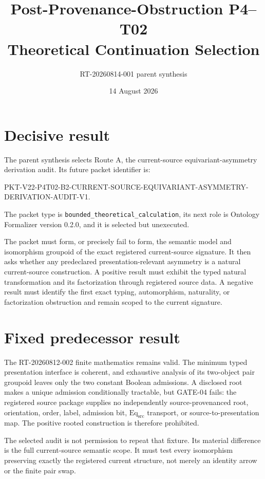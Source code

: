 \documentclass[11pt]{article}
\title{Post-Provenance-Obstruction P4--T02\\Theoretical Continuation Selection}
\author{RT-20260814-001 parent synthesis}
\date{14 August 2026}
\newcommand{\EqSrc}{\ensuremath{\mathrm{Eq}_{\mathrm{src}}}}
\begin{document}
\maketitle

\section{Decisive result}

The parent synthesis selects Route A, the current-source equivariant-asymmetry
derivation audit.  Its future packet identifier is:
{\small\ttfamily\raggedright
PKT-V22-P4T02-B2-CURRENT-SOURCE-EQUIVARIANT-ASYMMETRY-\linebreak
DERIVATION-AUDIT-V1.\par}
The packet type is \texttt{bounded\_theoretical\_calculation}, its next role
is Ontology Formalizer version 0.2.0, and it is selected but unexecuted.

The packet must form, or precisely fail to form, the semantic model and
isomorphism groupoid of the exact registered current-source signature.  It
then asks whether any predeclared presentation-relevant asymmetry is a natural
current-source construction.  A positive result must exhibit the typed natural
transformation and its factorization through registered source data.  A
negative result must identify the first exact typing, automorphism, naturality,
or factorization obstruction and remain scoped to the current signature.

\section{Fixed predecessor result}

The RT-20260812-002 finite mathematics remains valid.  The minimum typed
presentation interface is coherent, and exhaustive analysis of its two-object
pair groupoid leaves only the two constant Boolean admissions.  A disclosed
root makes a unique admission conditionally tractable, but GATE-04 fails: the
registered source package supplies no independently source-provenanced root,
orientation, order, label, admission bit, \EqSrc{} transport, or
source-to-presentation map.  The positive rooted construction is therefore
prohibited.

The selected audit is not permission to repeat that fixture.  Its material
difference is the full current-source semantic scope.  It must test every
isomorphism preserving exactly the registered current structure, not merely
an identity arrow or the finite pair swap.
\end{document}
